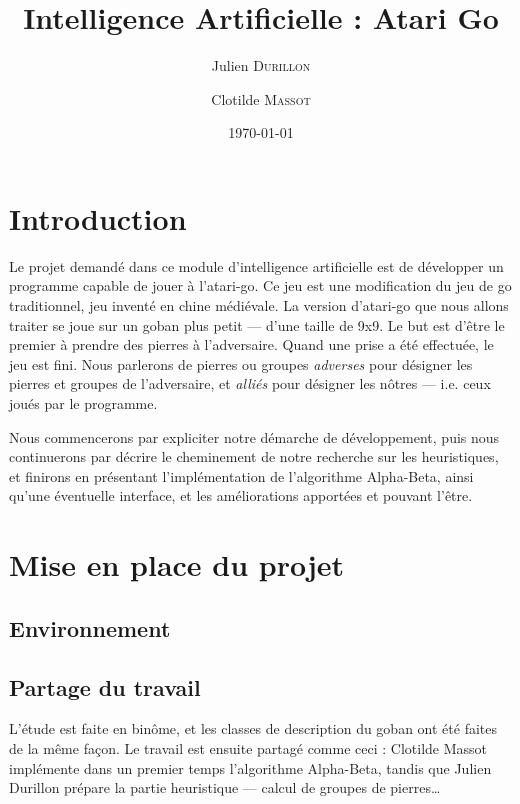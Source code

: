 \documentclass[11pt,a4paper,titlepage,french]{article}
\title{Intelligence Artificielle : Atari Go}
\author{Julien \textsc{Durillon} \and Clotilde \textsc{Massot}}
\date{\today}
\begin{document}
	

	\tableofcontents
	\clearpage

	\listoffigures
	\clearpage


	\section*{Introduction}
		Le projet demandé dans ce module d'intelligence artificielle est de développer un programme capable de jouer à l'atari-go. Ce jeu est une modification du jeu de go traditionnel, jeu inventé en chine médiévale. La version d'atari-go que nous allons traiter se joue sur un goban plus petit --- d'une taille de 9x9. Le but est d'être le premier à prendre des pierres à l'adversaire. Quand une prise a été effectuée, le jeu est fini. Nous parlerons de pierres ou groupes \emph{adverses} pour désigner les pierres et groupes de l'adversaire, et \emph{alliés} pour désigner les nôtres --- i.e. ceux joués par le programme.

		Nous commencerons par expliciter notre démarche de développement, puis nous continuerons par décrire le cheminement de notre recherche sur les heuristiques, et finirons en présentant l'implémentation de l'algorithme Alpha-Beta, ainsi qu'une éventuelle interface, et les améliorations apportées et pouvant l'être.

	\section{Mise en place du projet}
		\subsection{Environnement}
		\subsection{Partage du travail}
			L'étude est faite en binôme, et les classes de description du goban ont été faites de la même façon. Le travail est ensuite partagé comme ceci : Clotilde Massot implémente dans un premier temps l'algorithme Alpha-Beta, tandis que Julien Durillon prépare la partie heuristique --- calcul de groupes de pierres\dots %
\end{document}
